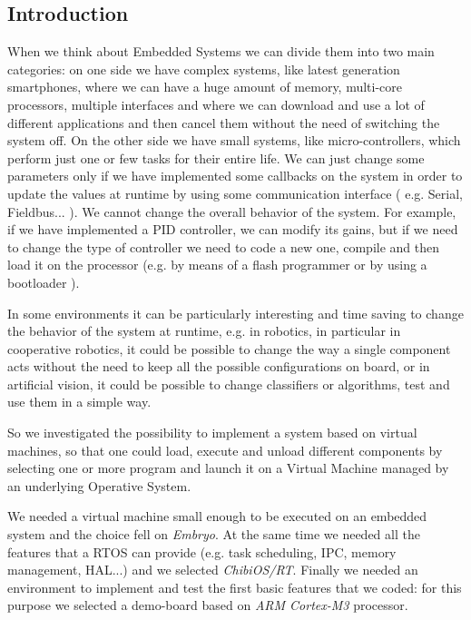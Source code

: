 \documentclass[a4paper,10pt]{article}
\begin{document}
\vspace{4ex}	%
\begin{multicols}{2}

\section{Introduction}

When we think about Embedded Systems we can divide them into two main categories: on one side we have complex systems, like latest generation smartphones, where we can have a huge amount of memory, multi-core processors, multiple interfaces and where we can download and use a lot of different applications and then cancel them without the need of switching the system off. On the other side we have small systems, like micro-controllers, which perform just one or few tasks for their entire life. We can just change some parameters only if we have implemented some callbacks on the system in order to update the values at runtime by using some communication interface ( e.g. Serial, Fieldbus... ). We cannot change the overall behavior of the system. For example, if we have implemented a PID controller, we can modify its gains, but if we need to change the type of controller we need to code a new one, compile and then load it on the processor (e.g. by means of a flash programmer or by using a bootloader ).\newline

In some environments it can be particularly interesting and time saving to change the behavior of the system at runtime, e.g. in robotics, in particular in cooperative robotics, it could be possible to change the way a single component acts without the need to keep all the possible configurations on board, or in artificial vision, it could be possible to change classifiers or algorithms, test and use them in a simple way.\newline

So we investigated the possibility to implement a system based on virtual machines, so that one could load, execute and unload different components by selecting one or more program and launch it on a Virtual Machine managed by an underlying Operative System.\newline

We needed a virtual machine small enough to be executed on an embedded system and the choice fell on \textit{Embryo}. At the same time we needed all the features that a RTOS can provide (e.g. task scheduling, IPC, memory management, HAL...) and we selected \textit{ChibiOS/RT}. Finally we needed an environment to implement and test the first basic features that we coded: for this purpose we selected a demo-board based on \textit{ARM Cortex\texttrademark-M3} processor.


\end{multicols}
\end{document}
